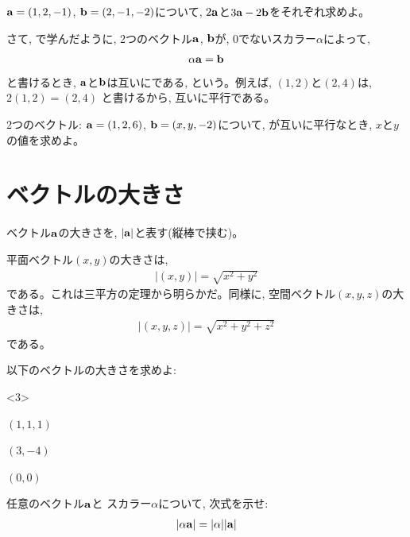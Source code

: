 \begin{q}\label{q:vect_3D0_calc} 
${\bf a}=(1, 2, -1)$, ${\bf b}=(2, -1, -2)$について, 
$2{\bf a}$と$3{\bf a}-2{\bf b}$をそれぞれ求めよ。
\end{q}\hv

さて, で学んだように, 
2つのベクトル${\bf a}$, ${\bf b}$が, 0でないスカラー$\alpha$によって, 
\begin{eqnarray}\alpha{\bf a}={\bf b}\end{eqnarray}
と書けるとき, ${\bf a}$と${\bf b}$は互いにである, 
という。例えば, $(1, 2)$と$(2, 4)$は, $2(1, 2)=(2, 4)$
と書けるから, 互いに平行である。\hv

\begin{q}\label{q:vect_3D0_parallel} 2つのベクトル: 
${\bf a}=(1, 2, 6)$, ${\bf b}=(x, y, -2)$について, 
が互いに平行なとき, $x$と$y$の値を求めよ。
\end{q}\vv


\section{ベクトルの大きさ}

ベクトル${\bf a}$の大きさを, $|{\bf a}|$と表す(縦棒で挟む)。

平面ベクトル$(x, y)$の大きさは, 
\begin{eqnarray}
|(x, y)|=\sqrt{x^2+y^2}\label{eq:vector_norm00}
\end{eqnarray}
である。これは三平方の定理から明らかだ。同様に, 
空間ベクトル$(x, y, z)$の大きさは, 
\begin{eqnarray}
|(x, y, z)|=\sqrt{x^2+y^2+z^2}\label{eq:vector_norm_3D}
\end{eqnarray}
である。\hv

\begin{q}\label{q:vector_norm2} 以下のベクトルの大きさを求めよ:
\begin{edaenumerate}<3>
\item $(1, 1, 1)$
\item $(3, -4)$
\item $(0, 0)$
\end{edaenumerate}\end{q}
\hv

\begin{q}\label{q:vect_length_scalar} 任意のベクトル${\bf a}$と
スカラー$\alpha$について, 次式を示せ:
\begin{eqnarray}
|\alpha{\bf a}|=|\alpha||{\bf a}|\label{eq:vect_scalar_absvalue}
\end{eqnarray}
\end{q}
\hv

